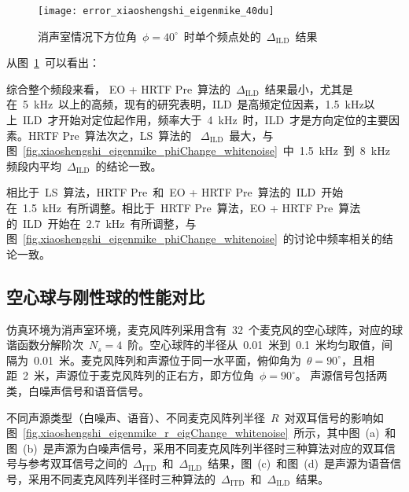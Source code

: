 \begin{figure}[!h]
\centering
\texttt{[image: error\_xiaoshengshi\_eigenmike\_40du]}
\caption{消声室情况下方位角~$\phi=40^{\circ}$~时单个频点处的~$\Delta_{\text{ILD}}$~结果}
\label{fig:xiaoshengshi_eigenmike_40du}
\end{figure}

从图~\ref{fig:xiaoshengshi_eigenmike_40du}~可以看出：

\begin{inparaenum}[（1）]

\item 综合整个频段来看， EO + HRTF Pre~算法的~$\Delta_{\text{ILD}}$~结果最小，尤其是在~5~kHz~以上的高频，现有的研究表明，ILD~是高频定位因素，1.5~kHz以上~ILD~才开始对定位起作用，频率大于~4~kHz~时，ILD~才是方向定位的主要因素。HRTF Pre~算法次之，LS~算法的~ $\Delta_{\text{ILD}}$~最大，与图~\ref{fig.xiaoshengshi_eigenmike_phiChange_whitenoise}~中~1.5~kHz~到~8~kHz~频段内平均~$\Delta_{\text{ILD}}$~的结论一致。

\item 相比于~LS~算法，HRTF Pre~和~EO + HRTF Pre~算法的~ILD~开始在~1.5~kHz~有所调整。相比于~HRTF Pre~算法，EO + HRTF Pre~算法的~ILD~开始在~2.7~kHz~有所调整，与图~\ref{fig.xiaoshengshi_eigenmike_phiChange_whitenoise}~的讨论中频率相关的结论一致。
\end{inparaenum}





\subsection{空心球与刚性球的性能对比}\label{subsec.open_rigid}

仿真环境为消声室环境，麦克风阵列采用含有~32~个麦克风的空心球阵，对应的球谐函数分解阶次~$N_{s}=4$~阶。空心球阵的半径从~0.01~米到~0.1~米均匀取值，间隔为~0.01~米。麦克风阵列和声源位于同一水平面，俯仰角为~$\theta=90^{\circ}$，且相距~2~米，声源位于麦克风阵列的正右方，即方位角~$\phi=90^{\circ}$。
声源信号包括两类，白噪声信号和语音信号。

不同声源类型（白噪声、语音）、不同麦克风阵列半径~$R$~对双耳信号的影响如图~\ref{fig.xiaoshengshi_eigenmike_r_eigChange_whitenoise}~所示，其中图~(a)~和图~(b)~是声源为白噪声信号，采用不同麦克风阵列半径时三种算法对应的双耳信号与参考双耳信号之间的~$\Delta_{\text{ITD}}$~和~$\Delta_{\text{ILD}}$~结果，图~(c)~和图~(d)~是声源为语音信号，采用不同麦克风阵列半径时三种算法的~$\Delta_{\text{ITD}}$~和~$\Delta_{\text{ILD}}$~结果。

